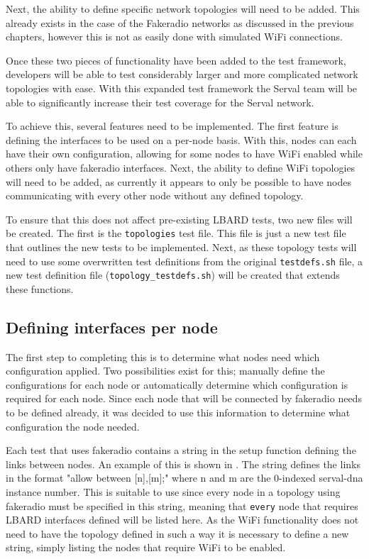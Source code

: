 Next, the ability to define specific network topologies will need to be added.
This already exists in the case of the Fakeradio networks as discussed in the previous chapters, however this is not as easily done with simulated WiFi connections.

Once these two pieces of functionality have been added to the test framework, developers will be able to test considerably larger and more complicated network topologies with ease.
With this expanded test framework the Serval team will be able to significantly increase their test coverage for the Serval network.


To achieve this, several features need to be implemented. 
The first feature is defining the interfaces to be used on a per-node basis.
With this, nodes can each have their own configuration, allowing for some nodes to have WiFi enabled while others only have fakeradio interfaces.
Next, the ability to define WiFi topologies will need to be added, as currently it appears to only be possible to have nodes communicating with every other node without any defined topology.

To ensure that this does not affect pre-existing LBARD tests, two new files will be created.
The first is the \verb|topologies| test file.
This file is just a new test file that outlines the new tests to be implemented.
Next, as these topology tests will need to use some overwritten test definitions from the original \texttt{testdefs.sh} file, a new test definition file (\texttt{topology\_testdefs.sh}) will be created that extends these functions.



\subsection{Defining interfaces per node}


The first step to completing this is to determine what nodes need which configuration applied.
Two possibilities exist for this; manually define the configurations for each node or automatically determine which configuration is required for each node.
Since each node that will be connected by fakeradio needs to be defined already, it was decided to use this information to determine what configuration the node needed.

Each test that uses fakeradio contains a string in the setup function defining the links between nodes.
An example of this is shown in . 
The string defines the links in the format "allow between [n],[m];" where n and m are the 0-indexed serval-dna instance number.
This is suitable to use since every node in a topology using fakeradio must be specified in this string, meaning that \verb|every| node that requires LBARD interfaces defined will be listed here.
As the WiFi functionality does not need to have the topology defined in such a way it is necessary to define a new string, simply listing the nodes that require WiFi to be enabled. 

